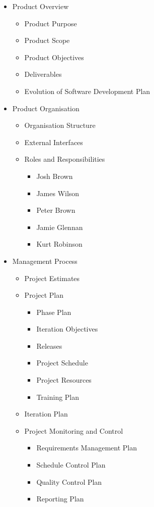 \begin{itemize}
	\item Product Overview
	\begin{itemize}
		\item Product Purpose
		\item Product Scope
		\item Product Objectives
		\item Deliverables
		\item Evolution of Software Development Plan
	\end{itemize}
	\item Product Organisation
	\begin{itemize}
		\item Organisation Structure
		\item External Interfaces
		\item Roles and Responsibilities
		\begin{itemize}
			\item Josh Brown
			\item James Wilson
			\item Peter Brown
			\item Jamie Glennan
			\item Kurt Robinson
		\end{itemize}
	\end{itemize}
	\item Management Process
	\begin{itemize}
		\item Project Estimates
		\item Project Plan
		\begin{itemize}
			\item Phase Plan
			\item Iteration Objectives
			\item Releases
			\item Project Schedule
			\item Project Resources
			\item Training Plan
		\end{itemize}
		\item Iteration Plan
		\item Project Monitoring and Control
		\begin{itemize}
			\item Requirements Management Plan
			\item Schedule Control Plan
			\item Quality Control Plan
			\item Reporting Plan

\end{itemize}
\end{itemize}
\end{itemize}
